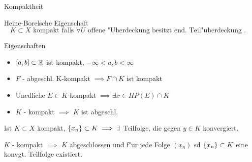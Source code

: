 \documentclass[class=article, crop=false]{standalone}
\begin{document}
\begin{zettel}{Kompaktheit}
\begin{flashcard}
    \begin{definition}[Kompaktheit] Heine-Borelsche Eigenschaft
\[
    K \subset X \text{ kompakt falls } \forall U \text{ offene "Uberdeckung besitzt end. Teil"uberdeckung } 
.\]
\end{definition}
\end{flashcard}

\begin{remark}
    Eigenschaften
\begin{itemize}
    \item $[a,b] \subset \mathbb{R}$ ist kompakt,  $-\infty < a,b < \infty $
    \item $F$ - abgeschl. K-kompakt $\implies F \cap K$ ist kompakt
    \item Unedliche $E \subset K $-kompakt  $\implies \exists x \in  HP (E) \cap K$ 
    \item $K$ - kompakt $\implies $ $K$ ist abgeschl.
\end{itemize}
\end{remark}

\begin{corollary}
Ist $K \subset X$ kompakt, $\set{x_n } \subset K \implies  \exists$ Teilfolge, die gegen $y \in  K$ konvergiert.
\end{corollary}

\begin{theorem}
$K$ - kompakt $\implies $  $K$ abgeschlossen und f"ur jede Folge $(x_n )$ sd $\set{x_n } \subset K$ eine konvgt. Teilfolge existiert.
\end{theorem}

\end{zettel}
\end{document}
